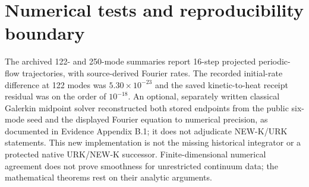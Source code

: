 \section{Numerical tests and reproducibility boundary}
The archived 122- and 250-mode summaries report 16-step projected periodic-flow trajectories, with source-derived Fourier rates. The recorded initial-rate difference at 122 modes was $5.30\times10^{-23}$ and the saved kinetic-to-heat receipt residual was on the order of $10^{-18}$. An optional, separately written classical Galerkin midpoint solver reconstructed both stored endpoints from the public six-mode seed and the displayed Fourier equation to numerical precision, as documented in Evidence Appendix B.1; it does not adjudicate NEW-K/URK statements. This new implementation is not the missing historical integrator or a protected native URK/NEW-K successor. Finite-dimensional numerical agreement does not prove smoothness for unrestricted continuum data; the mathematical theorems rest on their analytic arguments.

\clearpage
